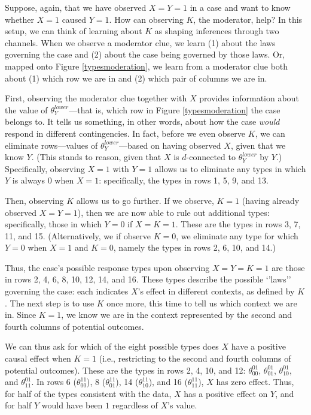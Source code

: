 \documentclass[12pt,]{book}
\begin{document}
Suppose, again, that we have observed \(X=Y=1\) in a case and want to know whether \(X=1\) caused \(Y=1\). How can observing \(K\), the moderator, help? In this setup, we can think of learning about \(K\) as shaping inferences through two channels. When we observe a moderator clue, we learn (1) about the laws governing the case and (2) about the case being governed by those laws. Or, mapped onto Figure \ref{typesmoderation}, we learn from a moderator clue both about (1) which row we are in and (2) which pair of columns we are in.

First, observing the moderator clue together with \(X\) provides information about the value of \(\theta_Y^{lower}\)---that is, which row in Figure \ref{typesmoderation} the case belongs to. It tells us something, in other words, about how the case \emph{would} respond in different contingencies. In fact, before we even observe \(K\), we can eliminate rows---values of \(\theta_Y^{lower}\)---based on having observed \(X\), given that we know \(Y\). (This stands to reason, given that \(X\) is \(d\)-connected to \(\theta_Y^{lower}\) by \(Y\).) Specifically, observing \(X=1\) with \(Y=1\) allows us to eliminate any types in which \(Y\) is always \(0\) when \(X=1\): specifically, the types in rows 1, 5, 9, and 13.

Then, observing \(K\) allows us to go further. If we observe, \(K=1\) (having already observed \(X=Y=1\)), then we are now able to rule out additional types: specifically, those in which \(Y=0\) if \(X=K=1\). These are the types in rows 3, 7, 11, and 15. (Alternatively, we if observe \(K=0\), we eliminate any type for which \(Y=0\) when \(X=1\) and \(K=0\), namely the types in rows 2, 6, 10, and 14.)

Thus, the case's possible response types upon observing \(X=Y=K=1\) are those in rows 2, 4, 6, 8, 10, 12, 14, and 16. These types describe the possible `'laws'' governing the case: each indicates \(X\)'s effect in different contexts, as defined by \(K\). The next step is to use \(K\) once more, this time to tell us which context we are in. Since \(K=1\), we know we are in the context represented by the second and fourth columns of potential outcomes.

We can thus ask for which of the eight possible types does \(X\) have a positive causal effect when \(K=1\) (i.e., restricting to the second and fourth columns of potential outcomes). These are the types in rows 2, 4, 10, and 12: \(\theta_{00}^{01}\), \(\theta_{01}^{01}\), \(\theta_{10}^{01}\), and \(\theta_{11}^{01}\). In rows 6 (\(\theta_{00}^{11}\)), 8 (\(\theta_{01}^{11}\)), 14 (\(\theta_{10}^{11}\)), and 16 (\(\theta_{11}^{11}\)), \(X\) has zero effect. Thus, for half of the types consistent with the data, \(X\) has a positive effect on \(Y\), and for half \(Y\) would have been \(1\) regardless of \(X\)'s value.
\end{document}
